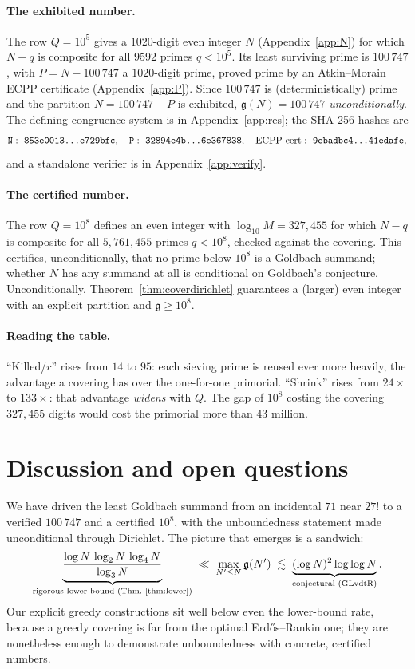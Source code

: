 \documentclass[11pt]{article}
\theoremstyle{plain}
\theoremstyle{definition}
\theoremstyle{remark}
\newcommand{\N}{N}
\newcommand{\g}{\mathfrak{g}}
\begin{document}
\paragraph{The exhibited number.} The row $Q=10^{5}$ gives a $1020$-digit even
integer $\N$ (Appendix~\ref{app:N}) for which $\N-q$ is composite for all $9592$
primes $q<10^{5}$. Its least surviving prime is $100\,747$, with
$P=\N-100\,747$ a $1020$-digit prime, proved prime by an Atkin--Morain ECPP
certificate (Appendix~\ref{app:P}). Since $100\,747$ is (deterministically) prime
and the partition $\N=100\,747+P$ is exhibited, $\g(\N)=100\,747$
\emph{unconditionally}. The defining
congruence system is in Appendix~\ref{app:res}; the SHA-256 hashes are
\[
\texttt{N}:\ \texttt{853e0013\dots e729bfc},\quad
\texttt{P}:\ \texttt{32894e4b\dots 6e367838},\quad
\text{ECPP cert}:\ \texttt{9ebadbc4\dots 41edafe},
\]
and a standalone verifier is in Appendix~\ref{app:verify}.

\paragraph{The certified number.} The row $Q=10^{8}$ defines an even integer with
$\log_{10}M=327{,}455$ for which $\N-q$ is composite for all $5{,}761{,}455$
primes $q<10^{8}$, checked against the covering. This certifies, unconditionally,
that no prime below $10^{8}$ is a Goldbach summand; whether $\N$ has any summand
at all is conditional on Goldbach's conjecture. Unconditionally,
Theorem~\ref{thm:coverdirichlet} guarantees a (larger) even integer with an
explicit partition and $\g\ge10^{8}$.

\paragraph{Reading the table.} ``Killed/$r$'' rises from $14$ to $95$: each
sieving prime is reused ever more heavily, the advantage a covering has over the
one-for-one primorial. ``Shrink'' rises from $24\times$ to $133\times$: that
advantage \emph{widens} with $Q$. The gap of $10^{8}$ costing the covering
$327{,}455$ digits would cost the primorial more than $43$ million.

\section{Discussion and open questions}

We have driven the least Goldbach summand from an incidental $71$ near $27!$ to a
verified $100\,747$ and a certified $10^{8}$, with the unboundedness statement
made unconditional through Dirichlet. The picture that emerges is a sandwich:
\[
\underbrace{\frac{\log \N\,\log_2 \N\,\log_4 \N}{\log_3 \N}}_{\text{rigorous lower bound (Thm.~\ref{thm:lower})}}
\;\ll\;\max_{\N'\le \N}\g(\N')\;\lesssim\;\underbrace{(\log \N)^2\log\log \N}_{\text{conjectural (GLvdtR)}}.
\]
Our explicit greedy constructions sit well below even the lower-bound rate,
because a greedy covering is far from the optimal Erd\H{o}s--Rankin one; they are
nonetheless enough to demonstrate unboundedness with concrete, certified numbers.
\end{document}
